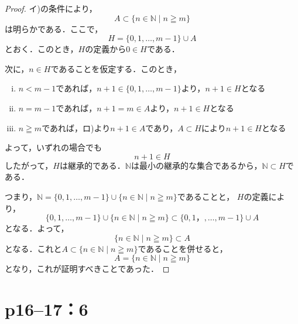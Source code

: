 \documentclass[a4paper,10pt,fleqn]{ltjsarticle}
\begin{document}
\begin{tleftbar}
    \begin{proof}
        イ)の条件により，
        \[
            A \subset \{n \in \mathbb{N} \mid n \geqq m\}
        \]
        は明らかである．ここで，
        \[
            H=\{0,1,\dots,m-1\} \cup A
        \]
        とおく．このとき，$H$の定義から$0 \in H$である．

        次に，$n \in H$であることを仮定する．このとき，
        \begin{enumerate}[(i)]
            \item  $n<m-1$であれば，$n+1 \in \{0,1,\dots,m-1\}$より，$n+1 \in H$となる
            \item $n=m-1$であれば，$n+1=m \in A$より，$n+1 \in H$となる
            \item $n \geqq m$であれば，ロ)より$n+1 \in A$であり，$A \subset H $により$n + 1\in H$となる
        \end{enumerate}
        よって，いずれの場合でも
        \[
            n+1 \in H
        \]
        したがって，$H$は継承的である．$\mathbb{N}$は最小の継承的な集合であるから，$\mathbb{N} \subset H$である．

        つまり，$\mathbb{N} =  \{0,1,\dots,m-1\} \cup \{n \in \mathbb{N} \mid n \geqq m \}$であることと，
        $H$の定義により，
        \[
            \{0,1,\dots,m-1\} \cup \{n \in \mathbb{N} \mid n \geqq m \} \subset \{0,1，,\dots,m-1\} \cup A
        \]
        となる．よって，
        \[
            \{n \in \mathbb{N}\mid n \geqq m \} \subset A
        \]
        となる．これと$ A \subset \{n \in \mathbb{N} \mid n \geqq m\}$であることを併せると，
        \[
            A=\{n \in \mathbb{N} \mid n \geqq m \}
        \]
        となり，これが証明すべきことであった．
    \end{proof}
\end{tleftbar}

\newpage

\section*{p16--17：6}

\end{document}
